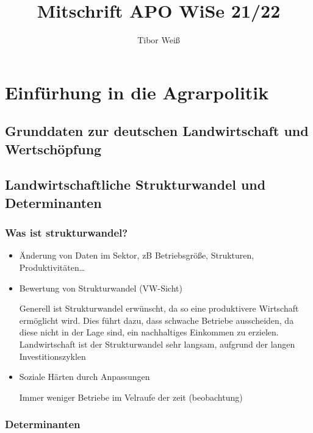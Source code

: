 \documentclass[11pt]{article}
\title{Mitschrift APO WiSe 21/22}
\author{Tibor Weiß}
\begin{document}
\maketitle
\section{Einfürhung in die Agrarpolitik}

\subsection{Grunddaten zur deutschen Land\-wirt\-schaft und Wert\-schöpf\-ung}


\subsection{Landwirtschaftliche Strukturwandel und Determinanten}

\subsubsection{Was ist strukturwandel?}
\begin{itemize}
	\item{Änderung von Daten im Sektor, zB Betriebsgröße, Strukturen, Produktivitäten\ldots}
	\item{Bewertung von Strukturwandel (VW-Sicht)}

		Generell ist Strukturwandel erwünscht, da so eine produktivere Wirtschaft ermöglicht wird. Dies führt dazu, dass \glqq schwache\grqq{}  Betriebe ausscheiden, da diese nicht in der Lage sind, ein nachhaltiges Einkommen zu erzielen.
Landwirtschaft ist der Strukturwandel sehr langsam, aufgrund der langen Investitionszyklen
	\item{Soziale Härten durch Anpassungen}

Immer weniger Betriebe im Velraufe der zeit (beobachtung)

\end{itemize}


\subsubsection{Determinanten}
\end{document}
